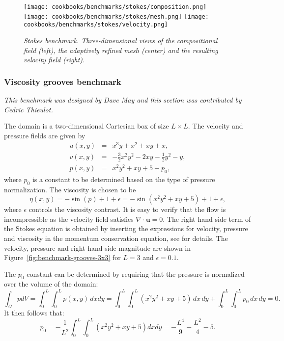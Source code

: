 \documentclass{article}
\begin{document}
\begin{figure}
  \begin{center}
    \texttt{[image: cookbooks/benchmarks/stokes/composition.png]}
    \hfill
    \texttt{[image: cookbooks/benchmarks/stokes/mesh.png]}
    \hfill
    \texttt{[image: cookbooks/benchmarks/stokes/velocity.png]}
  \end{center}
  \caption{\it Stokes benchmark. Three-dimensional views of the compositional
  field (left), the adaptively refined mesh (center) and the resulting velocity field
  (right).}
  \label{fig:stokes-falling-sphere-3d}
\end{figure}



\subsubsection{Viscosity grooves benchmark}
\label{sec:viscosity_grooves}

\textit{This benchmark was designed by Dave May and this section was contributed by Cedric Thieulot.} 

The domain is a two-dimensional Cartesian box of size $L\times L$.
The velocity and pressure fields are given by
\begin{eqnarray}
u(x,y) &=& x^3 y + x^2 + xy + x, \\
v(x,y) &=& -\frac{3}{2}x^2y^2 - 2xy - \frac{1}{2}y^2 - y, \\
p(x,y) &=& x^2y^2 + xy + 5 + p_0,
\end{eqnarray}
where $p_0$ is a constant to be determined based on the type of pressure normalization.
The viscosity is chosen to be
\begin{equation}
\eta(x,y)=-\sin(p)+1+\epsilon = -\sin (x^2y^2 + xy + 5) + 1 + \epsilon, 
\end{equation}
where $\epsilon$ controls the viscosity contrast. 
It is easy to verify that the flow is incompressible as the velocity field satisfies $\nabla\cdot \mathbf u = 0$.
The right hand side term of the Stokes equation is obtained by inserting 
the expressions for velocity, pressure and viscosity in the momentum conservation equation, see \cite{fieldstone} for details.
The velocity, pressure and right hand side magnitude are shown in Figure~\ref{fig:benchmark-grooves-3x3} 
for $L=3$ and $\epsilon=0.1$.
 
The $p_0$ constant can be determined by requiring that the pressure is normalized over the 
volume of the domain:
\begin{equation}
\int_\Omega p dV=
\int_0^L\int_0^L p(x,y) \, dx dy = 
\int_0^L\int_0^L (x^2y^2+xy+5)\, dx \, dy + \int_0^L \int_0^L p_0 \, dx \, dy =0.
\end{equation}
It then follows that:
\begin{equation}
p_0 =-  \frac{1}{L^2}  \int_0^L\int_0^L (x^2y^2+xy+5) dx dy
= -\frac{L^4}{9}-\frac{L^2}{4} - 5. 
\end{equation}
\end{document}
